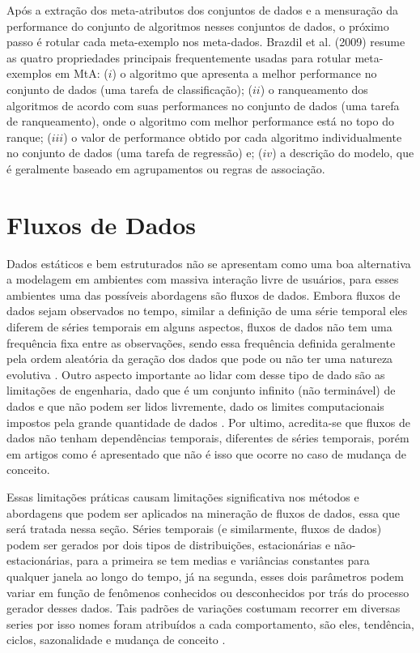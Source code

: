 Após a extração dos meta-atributos dos conjuntos de dados e a mensuração da
performance do conjunto de algoritmos nesses conjuntos de dados, o próximo
passo é rotular cada meta-exemplo nos meta-dados.
Brazdil et al. (2009) \cite{Brazdil2009} resume as quatro propriedades
principais frequentemente usadas para rotular meta-exemplos em MtA: ($i$)
o algoritmo que apresenta a melhor performance no conjunto de dados (uma tarefa
de classificação); ($ii$) o ranqueamento dos algoritmos de acordo com suas
performances no conjunto de dados (uma tarefa de ranqueamento), onde o
algoritmo com melhor performance está no topo do ranque; ($iii$) o valor de
performance obtido por cada algoritmo individualmente no conjunto de dados (uma
tarefa de regressão) e; ($iv$) a descrição do modelo, que é geralmente baseado
em agrupamentos ou regras de associação.

\section{Fluxos de Dados}

\label{sec:datastreams}
Dados estáticos e bem estruturados não se apresentam como uma boa alternativa a
modelagem em ambientes com massiva interação livre de usuários, para esses
ambientes uma das possíveis abordagens são fluxos de
dados\cite{babcock2002models}.
Embora fluxos de dados sejam observados no tempo, similar a definição de uma
série temporal eles diferem de séries temporais em alguns aspectos, fluxos de
dados não tem uma frequência fixa entre as observações, sendo essa frequência
definida geralmente pela ordem aleatória da geração dos dados que pode ou não
ter uma natureza evolutiva  \cite{gama2007learning}. Outro aspecto importante
ao lidar com desse tipo de dado são as limitações de engenharia, dado que é um
conjunto infinito (não terminável) de dados e que não podem ser lidos
livremente, dado os limites computacionais impostos pela grande quantidade de
dados \cite{babcock2002models}. Por ultimo, acredita-se que fluxos de dados não
tenham dependências temporais, diferentes de séries temporais, porém em artigos
como \cite{read2018concept} é apresentado que não é isso que ocorre no caso de
mudança de conceito.

Essas limitações práticas causam limitações significativa nos métodos e
abordagens que podem ser aplicados na mineração de fluxos de dados, essa que
será tratada nessa seção. Séries temporais (e similarmente, fluxos de dados)
podem ser gerados por dois tipos de distribuições, estacionárias e
não-estacionárias, para a primeira se tem medias e variâncias constantes para
qualquer janela ao longo do tempo, já na segunda, esses dois parâmetros podem
variar em função de fenômenos conhecidos ou desconhecidos por trás do processo
gerador desses dados\cite{read2018concept}. Tais padrões de variações costumam
recorrer em diversas series por isso nomes foram atribuídos a cada
comportamento, são eles, tendência, ciclos, sazonalidade e mudança de conceito
\cite{hyndman2018forecasting,tsymbal2004problem,brockwell2016introduction}.

